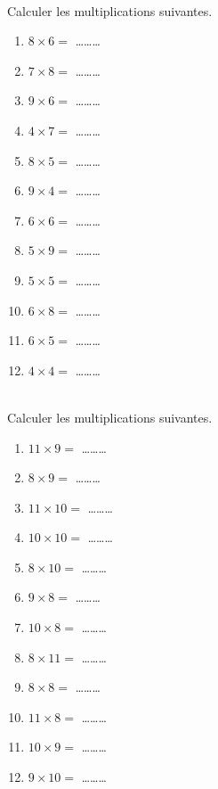 \exercice \diff[2] \\
Calculer les multiplications suivantes.
\begin{multicols}{4}
\begin{enumerate}
\item $8 \times 6 =$ \ldots\ldots\ldots
\item $7 \times 8 =$ \ldots\ldots\ldots
\item $9 \times 6 =$ \ldots\ldots\ldots
\item $4 \times 7 =$ \ldots\ldots\ldots
\item $8 \times 5 =$ \ldots\ldots\ldots
\item $9 \times 4 =$ \ldots\ldots\ldots
\item $6 \times 6 =$ \ldots\ldots\ldots
\item $5 \times 9 =$ \ldots\ldots\ldots
\item $5 \times 5 =$ \ldots\ldots\ldots
\item $6 \times 8 =$ \ldots\ldots\ldots
\item $6 \times 5 =$ \ldots\ldots\ldots
\item $4 \times 4 =$ \ldots\ldots\ldots
\end{enumerate}
\end{multicols}

\exercice \diff[3] \\
Calculer les multiplications suivantes.
\begin{multicols}{4}
\begin{enumerate}
\item $11 \times 9 =$ \ldots\ldots\ldots
\item $8 \times 9 =$ \ldots\ldots\ldots
\item $11 \times 10 =$ \ldots\ldots\ldots
\item $10 \times 10 =$ \ldots\ldots\ldots
\item $8 \times 10 =$ \ldots\ldots\ldots
\item $9 \times 8 =$ \ldots\ldots\ldots
\item $10 \times 8 =$ \ldots\ldots\ldots
\item $8 \times 11 =$ \ldots\ldots\ldots
\item $8 \times 8 =$ \ldots\ldots\ldots
\item $11 \times 8 =$ \ldots\ldots\ldots
\item $10 \times 9 =$ \ldots\ldots\ldots
\item $9 \times 10 =$ \ldots\ldots\ldots
\end{enumerate}
\end{multicols}


